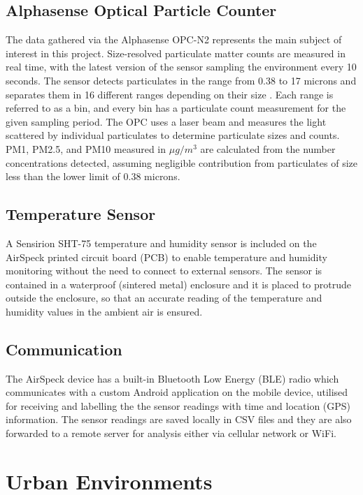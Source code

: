 \documentclass[bsc,frontabs,twoside,singlespacing, parskip,deptreport]{infthesis}     %
\begin{document}
\subsection*{Alphasense Optical Particle Counter}

The data gathered via the Alphasense OPC-N2 \cite{opc} represents the main subject of interest in this project. Size-resolved particulate matter counts are measured in real time, with the latest version of the sensor sampling the environment every 10 seconds. The sensor detects particulates in the range from 0.38 to 17 microns and separates them in 16 different ranges depending on their size \cite{airspeck}. Each range is referred to as a bin, and every bin has a particulate count measurement for the given sampling period. The OPC uses a laser beam and measures the light scattered by individual particulates to determine particulate sizes and counts. PM1, PM2.5, and PM10 measured in $ \mu g /m^3 $ are calculated from the number concentrations detected, assuming negligible contribution from particulates of size less than the lower limit of 0.38 microns.


\subsection*{Temperature Sensor}

A Sensirion SHT-75 temperature and humidity sensor \cite{sensirion} is included on the AirSpeck printed circuit board (PCB) to enable temperature and humidity monitoring without the need to connect to external sensors. The sensor is contained in a waterproof (sintered metal) enclosure \cite{airspeck} and it is placed to protrude outside the enclosure, so that an accurate reading of the temperature and humidity values in the ambient air is ensured.


\subsection*{Communication}

The AirSpeck device has a built-in Bluetooth Low Energy (BLE) radio which communicates with a custom Android application on the mobile device, utilised for receiving and labelling the the sensor readings with time and location (GPS) information. The sensor readings are saved locally in CSV files and they are also forwarded to a remote server for analysis either via cellular network or WiFi.

\section{Urban Environments}
\end{document}
